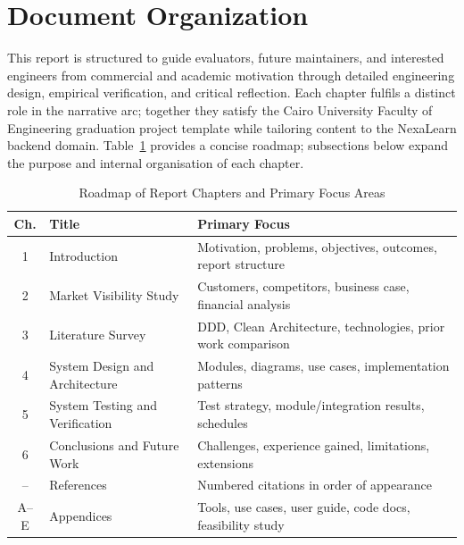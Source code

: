 
\section{Document Organization}
\label{sec:document-organization}

This report is structured to guide evaluators, future maintainers, and interested engineers from commercial and academic motivation through detailed engineering design, empirical verification, and critical reflection. Each chapter fulfils a distinct role in the narrative arc; together they satisfy the Cairo University Faculty of Engineering graduation project template while tailoring content to the NexaLearn backend domain. Table~\ref{tab:chapter-roadmap} provides a concise roadmap; subsections below expand the purpose and internal organisation of each chapter.

\begin{table}[H]
  \centering
  \caption{Roadmap of Report Chapters and Primary Focus Areas}
  \label{tab:chapter-roadmap}
  \small
  \begin{tabular}{@{}clp{7.8cm}@{}}
    \toprule
    \textbf{Ch.} & \textbf{Title} & \textbf{Primary Focus} \\
    \midrule
    1 & Introduction &
    Motivation, problems, objectives, outcomes, report structure \\
    2 & Market Visibility Study &
    Customers, competitors, business case, financial analysis \\
    3 & Literature Survey &
    DDD, Clean Architecture, technologies, prior work comparison \\
    4 & System Design and Architecture &
    Modules, diagrams, use cases, implementation patterns \\
    5 & System Testing and Verification &
    Test strategy, module/integration results, schedules \\
    6 & Conclusions and Future Work &
    Challenges, experience gained, limitations, extensions \\
    \midrule
    -- & References &
    Numbered citations in order of appearance \\
    A--E & Appendices &
    Tools, use cases, user guide, code docs, feasibility study \\
    \bottomrule
  \end{tabular}
\end{table}

